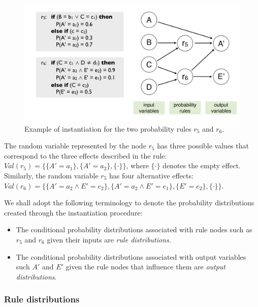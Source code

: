 \begin{figure}[ht]
\centering
\includegraphics[scale=0.25]{imgs/ruleinstantiation.pdf}
\caption{Example of instantiation for the two probability rules $r_5$ and $r_6$. }
\label{fig:instantiationprob}
\end{figure}

The random variable represented by the node $r_5$ has three possible values that correspond to the three effects described in the rule: $\mathit{Val}(r_5) = \{ \{A'\!=\!a_1\}, \{A'\!=\!a_2\}, \{\cdot\}\}$, where $\{\cdot\}$ denotes the empty effect.  Similarly, the random variable $r_5$ has four alternative effects: $\mathit{Val}(r_6) = \{\{A'\!=\!a_2 \land E'\!=\!e_2\}, \{A'\!=\!a_2 \land E'\!=\!e_1\}, \{E'=e_2\}, \{\cdot\}\}$. 

We shall adopt the following terminology to denote the probability distributions created through the instantiation procedure: 
\begin{itemize}
\item The conditional probability distributions associated with rule nodes such as $r_5$ and $r_6$ given their inputs are \textit{rule distributions}.
\item The conditional probability distributions associated with output variables such $A'$ and $E'$ given the rule nodes that influence them are \textit{output distributions}.
\end{itemize}

\subsubsection*{Rule distributions}

